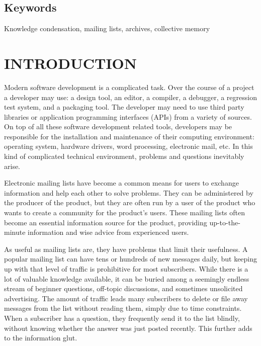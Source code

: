 \subsection{Keywords}
Knowledge condensation, mailing lists, archives, collective memory

\section{INTRODUCTION}
Modern software development is a complicated task. Over the course of a project
a developer may use: a design tool, an editor, a compiler, a debugger, a
regression test system, and a packaging tool. The developer may need to use
third party libraries or application programming interfaces (APIs) from a
variety of sources. On top of all these software development related tools,
developers may be responsible for the installation and maintenance of their
computing environment: operating system, hardware drivers, word processing,
electronic mail, etc. In this kind of complicated technical environment,
problems and questions inevitably arise.


Electronic mailing lists have become a common means for users to exchange
information and help each other to solve problems. They can be administered by
the producer of the product, but they are often run by a user of the product
who wants to create a community for the product's users. These mailing lists
often become an essential information source for the product, providing
up-to-the-minute information and wise advice from experienced users.

As useful as mailing lists are, they have problems that limit their usefulness.
A popular mailing list can have tens or hundreds of new messages daily, but
keeping up with that level of traffic is prohibitive for most subscribers.
While there is a lot of valuable knowledge available, it can be buried among a
seemingly endless stream of beginner questions, off-topic discussions, and
sometimes unsolicited advertising. The amount of traffic leads many subscribers
to delete or file away messages from the list without reading them, simply due
to time constraints. When a subscriber has a question, they frequently send it
to the list blindly, without knowing whether the answer was just posted
recently. This further adds to the information glut.

